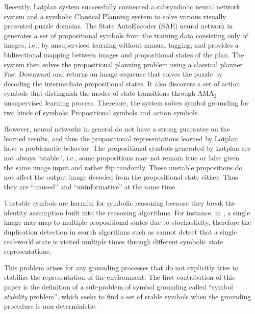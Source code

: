 Recently, Latplan system \cite[]{Asai2018} successfully
connected a subsymbolic neural network system and a symbolic Classical Planning system
to solve various visually presented puzzle domains.
The State AutoEncoder (SAE) neural network in \latentplanner
generates a set of propositional symbols from the training data consisting only of images,
i.e., by unsupervised learning without manual tagging,
and provides a bidirectional mapping between images and propositional states of the plan.
% 
The system then solves the propositional planning problem using a classical planner Fast Downward \cite{Helmert04}
and returns an image sequence that solves the puzzle
by decoding the intermediate propositional states.
It also discovers a set of action symbols that distinguish the modes of
state transitions through AMA$_2$ unsupervised learning process.
Therefore, the system solves symbol grounding for two kinds of symbols:
Propositional symbols and action symbols.

However,
neural networks in general do not have a strong guarantee on the learned results,
and thus the propositional representations learned by Latplan have a problematic behavior.
The propositional symbols generated by Latplan are not always
``stable'', i.e., some propositions may not remain true or false given the same image input
and rather flip randomly.
These unstable propositions do not affect the output image decoded from the propositional state either.
Thus they are ``unused'' and ``uninformative'' at the same time.

Unstable symbols are harmful for symbolic reasoning because
they break the identity assumption built into the reasoning algorithms.
For instance, in \latentplanner, 
a single image may map to multiple propositional states due to stochasticity,
therefore the duplication detection in search algorithms such as \astar \cite{hart1968formal}
cannot detect that a single real-world state is visited multiple times through
different symbolic state representations.

This problem arises for any grounding processes that do not explicitly tries to stabilize the
representation of the environment.
The first contribution of this paper is the definition of a sub-problem of symbol grounding
called ``symbol \emph{stability} problem'', which seeks to find a set of stable symbols
when the grounding procedure is non-deterministic.

